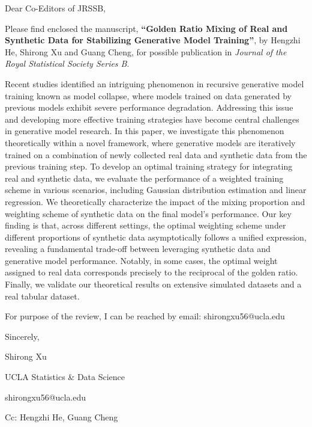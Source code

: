 \documentclass[12pt]{article}
\begin{document}
Dear Co-Editors of JRSSB,  

\bigskip

Please find enclosed the manuscript, \textbf{“Golden Ratio Mixing of Real and Synthetic Data for Stabilizing Generative Model Training”}, by Hengzhi He, Shirong Xu and Guang Cheng, for possible publication in \textit{Journal of the Royal Statistical Society Series B}.  

\bigskip

Recent studies identified an intriguing phenomenon in recursive generative model training known as model collapse, where models trained on data generated by previous models exhibit severe performance degradation. Addressing this issue and developing more effective training strategies have become central challenges in generative model research. In this paper, we investigate this phenomenon theoretically within a novel framework, where generative models are iteratively trained on a combination of newly collected real data and synthetic data from the previous training step. To develop an optimal training strategy for integrating real and synthetic data, we evaluate the performance of a weighted training scheme in various scenarios, including Gaussian distribution estimation and linear regression. We theoretically characterize the impact of the mixing proportion and weighting scheme of synthetic data on the final model's performance. Our key finding is that, across different settings, the optimal weighting scheme under different proportions of synthetic data asymptotically follows a unified expression, revealing a fundamental trade-off between leveraging synthetic data and generative model performance. Notably, in some cases, the optimal weight assigned to real data corresponds precisely to the reciprocal of the golden ratio. Finally, we validate our theoretical results on extensive simulated datasets and a real tabular dataset.
\bigskip

For purpose of the review, I can be reached by email: shirongxu56@ucla.edu

\bigskip

Sincerely,  

\bigskip

Shirong Xu

UCLA Statistics \& Data Science

shirongxu56@ucla.edu

\bigskip

Cc: Hengzhi He, Guang Cheng  
\end{document}
